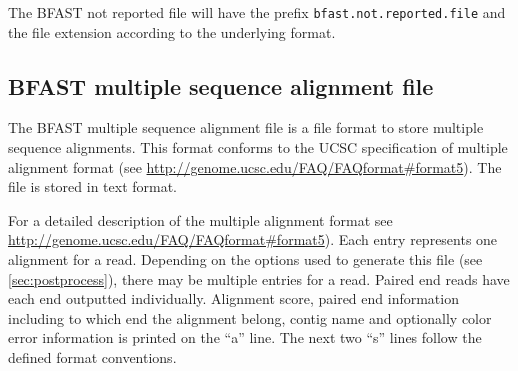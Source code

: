 \documentclass[a4paper,12pt]{book}
\newcommand{\TT}[1]{{\tt #1}} %
\newcommand{\QU}[1]{``#1''} %
\newcommand{\BNRF}{BFAST not reported file} %
\newcommand{\BMAF}{BFAST multiple sequence alignment file} %
\begin{document}
The \BNRF{} will have the prefix \TT{bfast.not.reported.file} and the file extension according to the underlying format.

\subsection{\BMAF{}}
\label{sec:bmaf}
The \BMAF{} is a file format to store multiple sequence alignments.
This format conforms to the UCSC specification of  multiple alignment format (see \url{http://genome.ucsc.edu/FAQ/FAQformat#format5}).
The file is stored in text format.

For a detailed description of the multiple alignment format see \url{http://genome.ucsc.edu/FAQ/FAQformat#format5}).
Each entry represents one alignment for a read. 
Depending on the options used to generate this file (see \autoref{sec:postprocess}), there may be multiple entries for a read.
Paired end reads have each end outputted individually.
Alignment score, paired end information including to which end the alignment belong, contig name and optionally color error information is printed on the \QU{a} line.
The next two \QU{s} lines follow the defined format conventions.
\end{document}

